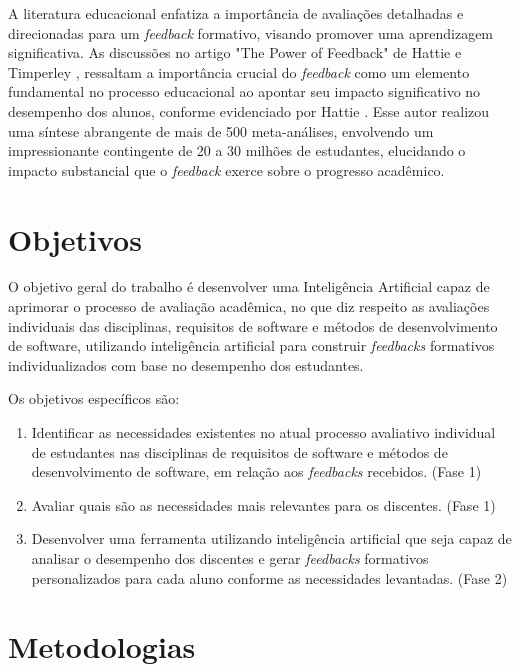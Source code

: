 A literatura educacional enfatiza a importância de avaliações detalhadas e direcionadas para um \textit{feedback} formativo, visando promover uma aprendizagem significativa. As discussões no artigo "The Power of Feedback" de Hattie e Timperley \cite{hattie2007}, ressaltam a importância crucial do \textit{feedback} como um elemento fundamental no processo educacional ao apontar seu impacto significativo no desempenho dos alunos, conforme evidenciado por Hattie \cite{hattie2007}. Esse autor realizou uma síntese abrangente de mais de 500 meta-análises, envolvendo um impressionante contingente de 20 a 30 milhões de estudantes, elucidando o impacto substancial que o \textit{feedback} exerce sobre o progresso acadêmico. 

\section{Objetivos}

O objetivo geral do trabalho é desenvolver uma Inteligência Artificial capaz de aprimorar o processo de avaliação acadêmica, no que diz respeito as avaliações individuais das disciplinas, requisitos de software e métodos de desenvolvimento de software, utilizando inteligência artificial para construir \textit{feedbacks} formativos individualizados com base no desempenho dos estudantes.

Os objetivos específicos são:

\begin{enumerate}
  \item Identificar as necessidades existentes no atual processo avaliativo individual de estudantes nas disciplinas de requisitos de software e métodos de desenvolvimento de software, em relação aos \textit{feedbacks} recebidos. (Fase 1)
  \item Avaliar quais são as necessidades mais relevantes para os discentes. (Fase 1)
  \item Desenvolver uma ferramenta utilizando inteligência artificial que seja capaz de analisar o desempenho dos discentes e gerar \textit{feedbacks} formativos personalizados para cada aluno conforme as necessidades levantadas. (Fase 2)
\end{enumerate}

\section{Metodologias}

